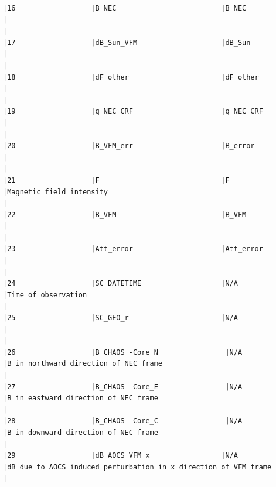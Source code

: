 \begin{verbatim}
|16                  |B_NEC                         |B_NEC                         |                                                                                                    |
|17                  |dB_Sun_VFM                    |dB_Sun                        |                                                                                                    |
|18                  |dF_other                      |dF_other                      |                                                                                                    |
|19                  |q_NEC_CRF                     |q_NEC_CRF                     |                                                                                                    |
|20                  |B_VFM_err                     |B_error                       |                                                                                                    |
|21                  |F                             |F                             |Magnetic field intensity                                                                            |
|22                  |B_VFM                         |B_VFM                         |                                                                                                    |
|23                  |Att_error                     |Att_error                     |                                                                                                    |
|24                  |SC_DATETIME                   |N/A                           |Time of observation                                                                                 |
|25                  |SC_GEO_r                      |N/A                           |                                                                                                    |
|26                  |B_CHAOS -Core_N                |N/A                           |B in northward direction of NEC frame                                                               |
|27                  |B_CHAOS -Core_E                |N/A                           |B in eastward direction of NEC frame                                                                |
|28                  |B_CHAOS -Core_C                |N/A                           |B in downward direction of NEC frame                                                                |
|29                  |dB_AOCS_VFM_x                 |N/A                           |dB due to AOCS induced perturbation in x direction of VFM frame                                     |

\end{verbatim}
